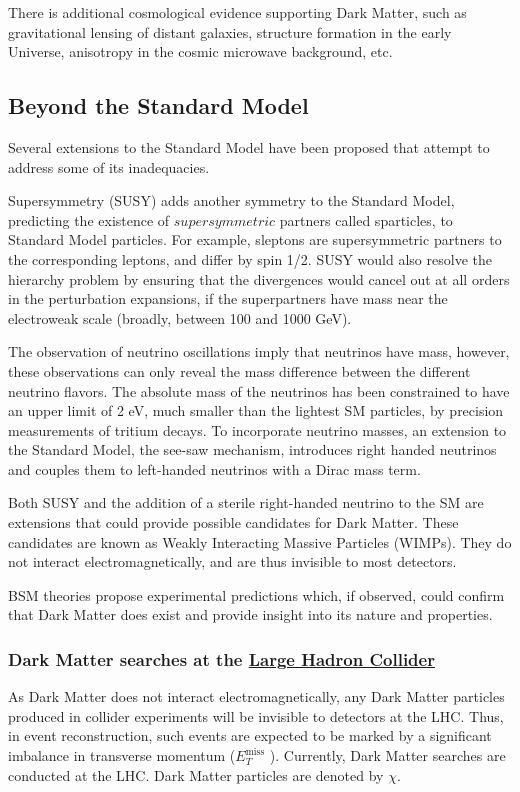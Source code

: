 \documentclass[11pt,a4paper,openright,twoside]{report}
\newcommand{\met}{$E_T^{\mathrm{miss}}$ }
\begin{document}
There is additional cosmological evidence supporting Dark Matter, such as gravitational lensing of distant galaxies, structure formation in the early Universe, anisotropy in the cosmic microwave background, etc.

\subsection{Beyond the Standard Model}
Several extensions to the Standard Model have been proposed that attempt to address some of its inadequacies. 

Supersymmetry (SUSY) adds another symmetry to the Standard Model, predicting the existence of $supersymmetric$ partners called sparticles, to Standard Model particles. For example, sleptons are supersymmetric partners to the corresponding leptons, and differ by spin 1/2. SUSY would also resolve the hierarchy problem by ensuring that the divergences would cancel out at all orders in the perturbation expansions, if the superpartners have mass near the electroweak scale (broadly, between 100 and 1000 GeV).

The observation of neutrino oscillations imply that neutrinos have mass, however, these observations can only reveal the mass difference between the different neutrino flavors. The absolute mass of the neutrinos has been constrained to have an upper limit of 2 eV, much smaller than the lightest SM particles, by precision measurements of tritium decays. To incorporate neutrino masses, an extension to the Standard Model, the see-saw mechanism, introduces right handed neutrinos and couples them to left-handed neutrinos with a Dirac mass term.

Both SUSY and the addition of a sterile right-handed neutrino to the SM are extensions that could provide possible candidates for Dark Matter. These candidates are known as Weakly Interacting Massive Particles (WIMPs). They do not interact electromagnetically, and are thus invisible to most detectors.

BSM theories propose experimental predictions which, if observed, could confirm that Dark Matter does exist and provide insight into its nature and properties.

\subsubsection{Dark Matter searches at the \hyperref[ch:LHC]{Large Hadron Collider}}

As Dark Matter does not interact electromagnetically, any Dark Matter particles produced in collider experiments will be invisible to detectors at the LHC. Thus, in event reconstruction, such events are expected to be marked by a significant imbalance in transverse momentum (\met). Currently, Dark Matter searches are conducted at the LHC\cite{DM_searches}. Dark Matter particles are denoted by $\chi$.
\end{document}
